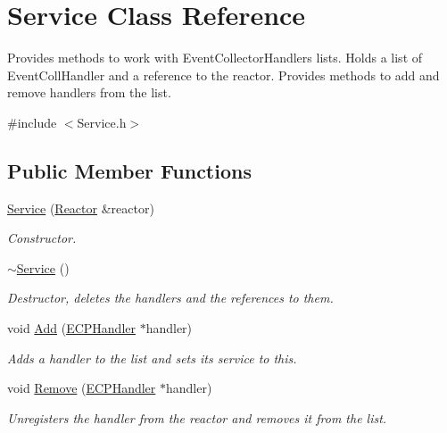 \hypertarget{class_service}{\section{Service Class Reference}
\label{class_service}
}


Provides methods to work with Event\-Collector\-Handlers lists. Holds a list of Event\-Coll\-Handler and a reference to the reactor. Provides methods to add and remove handlers from the list.  




{\ttfamily \#include $<$Service.\-h$>$}

\subsection*{Public Member Functions}
\begin{DoxyCompactItemize}
\item 
\hyperlink{class_service_afdf4b841bca28fe00ee4525e2882ff72}{Service} (\hyperlink{class_common_1_1_reactor}{Reactor} \&reactor)
\begin{DoxyCompactList}\small\item\em Constructor. \end{DoxyCompactList}\item 
\hypertarget{class_service_af6c3577b59652ac817d1d76aaccee904}{\hyperlink{class_service_af6c3577b59652ac817d1d76aaccee904}{$\sim$\-Service} ()}\label{class_service_af6c3577b59652ac817d1d76aaccee904}

\begin{DoxyCompactList}\small\item\em Destructor, deletes the handlers and the references to them. \end{DoxyCompactList}\item 
void \hyperlink{class_service_a7e563ec252f817e5a1cdfb40d07dd8fb}{Add} (\hyperlink{class_e_c_p_handler}{E\-C\-P\-Handler} $\ast$handler)
\begin{DoxyCompactList}\small\item\em Adds a handler to the list and sets its service to this. \end{DoxyCompactList}\item 
void \hyperlink{class_service_a060c72a96167cd02b72287e607b0f21c}{Remove} (\hyperlink{class_e_c_p_handler}{E\-C\-P\-Handler} $\ast$handler)
\begin{DoxyCompactList}\small\item\em Unregisters the handler from the reactor and removes it from the list. \end{DoxyCompactList}\end{DoxyCompactItemize}


